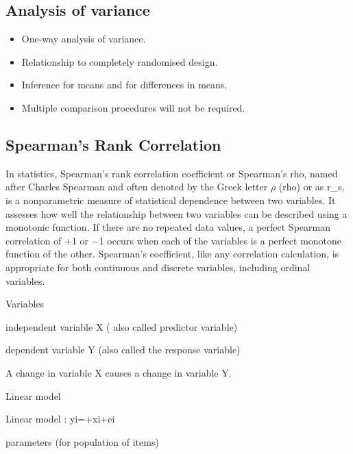 \subsection*{Analysis of variance}
\begin{itemize}
\item	One-way analysis of variance.

\item	Relationship to completely randomised design.
\item	Inference for means and for differences in means.
\item	Multiple comparison procedures will not be required.
\end{itemize}

\newpage
\subsection{Spearman's Rank Correlation}
In statistics, Spearman's rank correlation coefficient or Spearman's rho, named after Charles Spearman and often denoted by the Greek letter $\rho$ (rho) or as r_s, is a nonparametric measure of statistical dependence between two variables. It assesses how well the relationship between two variables can be described using a monotonic function. If there are no repeated data values, a perfect Spearman correlation of +1 or −1 occurs when each of the variables is a perfect monotone function of the other.
Spearman's coefficient, like any correlation calculation, is appropriate for both continuous and discrete variables, including ordinal variables.



 

Variables

 

independent variable X  ( also called predictor variable)

 

dependent variable Y (also called the response variable)

 

A change in variable X causes a change in variable Y.

 

Linear model

 

Linear model :  yi=+xi+ei 

 

 

parameters (for population of items)

 


